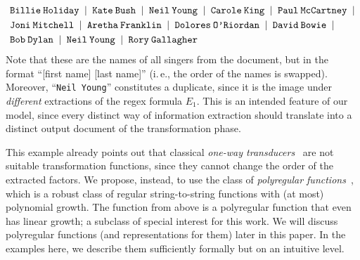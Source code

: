 \documentclass[
a4paper
]{article}
\theoremstyle{plain}
\theoremstyle{definition}
\theoremstyle{remark}
\begin{document}
\begin{align*}
&\scalebox{1}{\texttt{Billie}\:\texttt{Holiday} \hspace{2pt}\textbar\hspace{2pt} \texttt{Kate}\:\texttt{Bush} \hspace{2pt}\textbar\hspace{2pt} \texttt{Neil}\:\texttt{Young} \hspace{2pt}\textbar\hspace{2pt} \texttt{Carole}\:\texttt{King} \hspace{2pt}\textbar\hspace{2pt} \texttt{Paul}\:\texttt{McCartney} \hspace{2pt}\textbar}\\
&\scalebox{1}{\texttt{Joni}\:\texttt{Mitchell} \hspace{2pt}\textbar\hspace{2pt} \texttt{Aretha}\:\texttt{Franklin} \hspace{2pt}\textbar\hspace{2pt} \texttt{Dolores}\:\texttt{O’Riordan} \hspace{2pt}\textbar\hspace{2pt} \texttt{David}\:\texttt{Bowie} \hspace{2pt}\textbar}\\
&\scalebox{1}{\texttt{Bob}\:\texttt{Dylan} \hspace{2pt}\textbar\hspace{2pt} \texttt{Neil}\:\texttt{Young}  \hspace{2pt}\textbar\hspace{2pt} \texttt{Rory}\:\texttt{Gallagher}}
\end{align*}
Note that these are the names of all singers from the document, but in the format ``[first name] [last name]'' (i.\,e., the order of the names is swapped). Moreover, ``\texttt{Neil Young}'' constitutes a duplicate, since it is the image under \emph{different} extractions of the regex formula $E_1$.
This is an intended feature of our model, since every distinct way of information extraction should translate into a distinct output document of the transformation phase.

This example already points out that classical \emph{one-way transducers}~\cite{berstel2013transductions} 
are not suitable transformation functions, since they cannot change the order of the extracted factors.
We propose, instead, to
use the class of \emph{polyregular functions}~\cite{Bojanczyk22,engelfriet2002two}, which is a robust class of regular string-to-string functions with
(at most)
polynomial growth. The function from above is a polyregular function that even has linear growth; a subclass of special interest for this work. We will discuss polyregular functions (and representations for them) later in this paper. In the examples here, we describe them sufficiently formally but on an intuitive level. 
\end{document}
